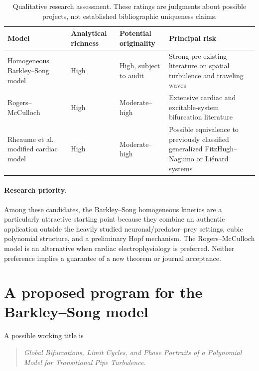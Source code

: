 \documentclass[11pt,a4paper]{article}
\begin{document}
\begin{table}[ht]
\centering
\small
\caption{Qualitative research assessment. These ratings are judgments about possible projects, not established bibliographic uniqueness claims.}
\label{tab:comparison}
\begin{tabularx}{\textwidth}{@{}p{}p{}p{}X@{}}
\toprule
\textbf{Model} & \textbf{Analytical richness} & \textbf{Potential originality} & \textbf{Principal risk}\\
\midrule
Homogeneous Barkley--Song model & High & High, subject to audit & Strong pre-existing literature on spatial turbulence and traveling waves\\[2pt]
Rogers--McCulloch & High & Moderate--high & Extensive cardiac and excitable-system bifurcation literature\\[2pt]
Rheaume et al. modified cardiac model & High & Moderate--high & Possible equivalence to previously classified generalized FitzHugh--Nagumo or Li\'enard systems\\
\bottomrule
\end{tabularx}
\end{table}

\paragraph{Research priority.}
Among these candidates, the Barkley--Song homogeneous kinetics are a particularly attractive starting point because they combine an authentic application outside the heavily studied neuronal/predator--prey settings, cubic polynomial structure, and a preliminary Hopf mechanism. The Rogers--McCulloch model is an alternative when cardiac electrophysiology is preferred. Neither preference implies a guarantee of a new theorem or journal acceptance.

\section{A proposed program for the Barkley--Song model}

A possible working title is
\begin{quote}
\emph{Global Bifurcations, Limit Cycles, and Phase Portraits of a Polynomial Model for Transitional Pipe Turbulence.}
\end{quote}
\end{document}
